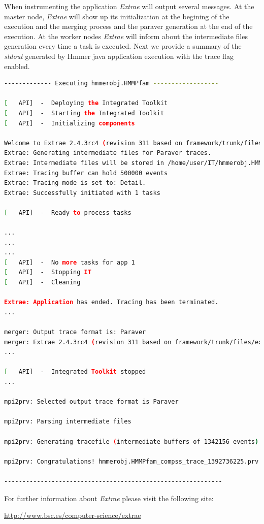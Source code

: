 When instrumenting the application \textit{Extrae} will output several messages. At the master node, \textit{Extrae} will show up its
initialization at the begining of the execution and the merging process and the paraver generation at the end of the execution. At the
worker nodes \textit{Extrae} will inform about the intermediate files generation every time a task is executed. Next we provide a 
summary of the \textit{stdout} generated by Hmmer java application execution with the trace flag enabled. 
\begin{lstlisting}[language=bash]
------------- Executing hmmerobj.HMMPfam ------------------

[   API]  -  Deploying the Integrated Toolkit
[   API]  -  Starting the Integrated Toolkit
[   API]  -  Initializing components

Welcome to Extrae 2.4.3rc4 (revision 311 based on framework/trunk/files/extrae)
Extrae: Generating intermediate files for Paraver traces.
Extrae: Intermediate files will be stored in /home/user/IT/hmmerobj.HMMPfam
Extrae: Tracing buffer can hold 500000 events
Extrae: Tracing mode is set to: Detail.
Extrae: Successfully initiated with 1 tasks

[   API]  -  Ready to process tasks

...
...
...
[   API]  -  No more tasks for app 1
[   API]  -  Stopping IT
[   API]  -  Cleaning

Extrae: Application has ended. Tracing has been terminated.
...

merger: Output trace format is: Paraver
merger: Extrae 2.4.3rc4 (revision 311 based on framework/trunk/files/extrae)
...

[   API]  -  Integrated Toolkit stopped
...

mpi2prv: Selected output trace format is Paraver

mpi2prv: Parsing intermediate files

mpi2prv: Generating tracefile (intermediate buffers of 1342156 events)

mpi2prv: Congratulations! hmmerobj.HMMPfam_compss_trace_1392736225.prv has been generated.

------------------------------------------------------------
\end{lstlisting}

For further information about \textit{Extrae} please visit the following site: 
\begin{center}
\url{http://www.bsc.es/computer-science/extrae} 
\end{center}


